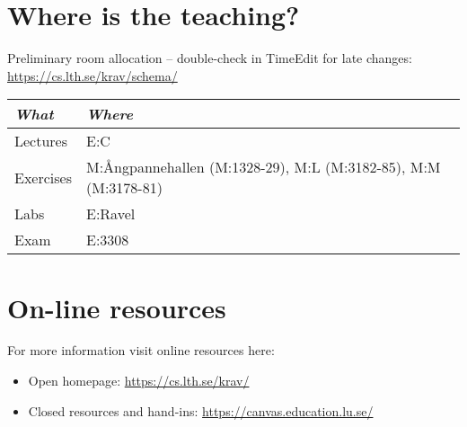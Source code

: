 \documentclass{program}
\begin{document}
\section{Where is the teaching?}

\noindent Preliminary room allocation -- double-check in TimeEdit for late changes:\\ \url{https://cs.lth.se/krav/schema/}
\begin{flushleft}
\small
\begin{tabular}{l | l } 
{\it What} & {\it Where} \\
\hline
Lectures & E:C  
\\
Exercises &  	
M:Ångpannehallen (M:1328-29),  	
M:L (M:3182-85),  	
M:M (M:3178-81) %
\\
Labs & E:Ravel %
\\
Exam & E:3308\\
\end{tabular}
\end{flushleft}


\section{On-line resources}
For more information visit online resources here:
\begin{itemize}[noitemsep]
  \item Open homepage: \url{https://cs.lth.se/krav/}
  \item Closed resources and hand-ins: \url{https://canvas.education.lu.se/}
\end{itemize}
\end{document}
